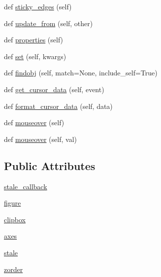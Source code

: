 \begin{DoxyCompactItemize}
\item 
def \hyperlink{classmatplotlib_1_1artist_1_1Artist_a67b7eecfe551ae8e639eee9b5a1c2a09}{sticky\+\_\+edges} (self)
\item 
def \hyperlink{classmatplotlib_1_1artist_1_1Artist_ad5ba4bc7c95126c9c4a299cb85692470}{update\+\_\+from} (self, other)
\item 
def \hyperlink{classmatplotlib_1_1artist_1_1Artist_a19c56a548db54fb79df0951d358d8e9d}{properties} (self)
\item 
def \hyperlink{classmatplotlib_1_1artist_1_1Artist_a45960d7e3f83ea6bd291d48116ca4d34}{set} (self, kwargs)
\item 
def \hyperlink{classmatplotlib_1_1artist_1_1Artist_a292ad76fb9ba8524add6abe5f78810f2}{findobj} (self, match=None, include\+\_\+self=True)
\item 
def \hyperlink{classmatplotlib_1_1artist_1_1Artist_a7db4cccb954fd76ecffab8ea7eab1b24}{get\+\_\+cursor\+\_\+data} (self, event)
\item 
def \hyperlink{classmatplotlib_1_1artist_1_1Artist_a3721e596c8f4044c80a6316721aa5a0b}{format\+\_\+cursor\+\_\+data} (self, data)
\item 
def \hyperlink{classmatplotlib_1_1artist_1_1Artist_aed89cc5afc1b370f92efd96b969b6c89}{mouseover} (self)
\item 
def \hyperlink{classmatplotlib_1_1artist_1_1Artist_a72303987b50ca8e6dd2e15133882b6f6}{mouseover} (self, val)
\end{DoxyCompactItemize}
\subsection*{Public Attributes}
\begin{DoxyCompactItemize}
\item 
\hyperlink{classmatplotlib_1_1artist_1_1Artist_a99b1b71f933007e82c6e61dbeba241da}{stale\+\_\+callback}
\item 
\hyperlink{classmatplotlib_1_1artist_1_1Artist_a5c7e7f6af78d3e35156318e4cb836c22}{figure}
\item 
\hyperlink{classmatplotlib_1_1artist_1_1Artist_abb9739de2f1e228609a20dcbd53a731f}{clipbox}
\item 
\hyperlink{classmatplotlib_1_1artist_1_1Artist_a4c93359f680068ea8c3beaea262ec72e}{axes}
\item 
\hyperlink{classmatplotlib_1_1artist_1_1Artist_a841fcb9610ac91a231c68932cba52afb}{stale}
\item 
\hyperlink{classmatplotlib_1_1artist_1_1Artist_a0d332802b2a7d805f42f1f84a05ddbbd}{zorder}
\end{DoxyCompactItemize}
